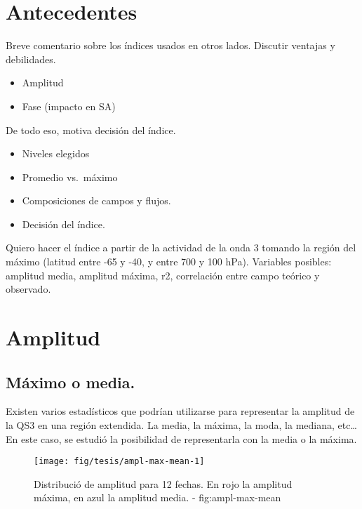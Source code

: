 \documentclass[spanish,a4paper]{book}
\providecommand{\tightlist}{%
  \setlength{\itemsep}{0pt}\setlength{\parskip}{0pt}}
\begin{document}
\section{Antecedentes}\label{antecedentes}

Breve comentario sobre los índices usados en otros lados. Discutir
ventajas y debilidades.

\begin{itemize}
\tightlist
\item
  Amplitud
\item
  Fase (impacto en SA)
\end{itemize}

De todo eso, motiva decisión del índice.

\begin{itemize}
\tightlist
\item
  Niveles elegidos
\item
  Promedio vs.~máximo
\item
  Composiciones de campos y flujos.
\item
  Decisión del índice.
\end{itemize}

Quiero hacer el índice a partir de la actividad de la onda 3 tomando la
región del máximo (latitud entre -65 y -40, y entre 700 y 100 hPa).
Variables posibles: amplitud media, amplitud máxima, r2, correlación
entre campo teórico y observado.

\section{Amplitud}\label{amplitud}

\subsection{Máximo o media.}\label{maximo-o-media.}

Existen varios estadísticos que podrían utilizarse para representar la
amplitud de la QS3 en una región extendida. La media, la máxima, la
moda, la mediana, etc\ldots{} En este caso, se estudió la posibilidad de
representarla con la media o la
máxima.

\begin{figure*}
\texttt{[image: fig/tesis/ampl-max-mean-1]} \caption{Distribució de amplitud para 12 fechas. En rojo la amplitud máxima, en azul la amplitud media. - fig:ampl-max-mean}\label{fig:ampl-max-mean}
\end{figure*}
\end{document}
